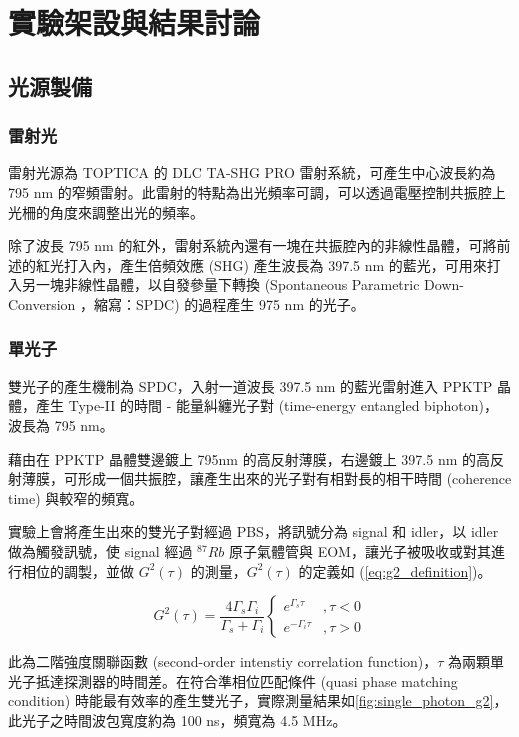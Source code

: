 \documentclass[class=NCU_thesis, crop=false]{standalone}
\begin{document}
\chapter{實驗架設與結果討論}

\section{光源製備}

\subsection{雷射光}
雷射光源為 TOPTICA 的 DLC TA-SHG PRO 雷射系統，可產生中心波長約為 795 nm 的窄頻雷射。此雷射的特點為出光頻率可調，可以透過電壓控制共振腔上光柵的角度來調整出光的頻率。

除了波長 795 nm 的紅外，雷射系統內還有一塊在共振腔內的非線性晶體，可將前述的紅光打入內，產生倍頻效應 (SHG) 產生波長為 397.5 nm 的藍光，可用來打入另一塊非線性晶體，以自發參量下轉換 (Spontaneous Parametric Down-Conversion ，縮寫：SPDC) 的過程產生 975 nm 的光子。


\subsection{單光子}
\label{subsection:single_photon}
雙光子的產生機制為 SPDC，入射一道波長 397.5 nm 的藍光雷射進入 PPKTP 晶體，產生 Type-II 的時間 - 能量糾纏光子對 (time-energy entangled biphoton)，波長為 795 nm。

藉由在 PPKTP 晶體雙邊鍍上 795nm 的高反射薄膜，右邊鍍上 397.5 nm 的高反射薄膜，可形成一個共振腔，讓產生出來的光子對有相對長的相干時間 (coherence time) 與較窄的頻寬。

實驗上會將產生出來的雙光子對經過 PBS，將訊號分為 signal 和 idler，以 idler 做為觸發訊號，使 signal 經過 $^{87}Rb$ 原子氣體管與 EOM，讓光子被吸收或對其進行相位的調製，並做 $G^{2}(\tau)$ 的測量，$G^{2}(\tau)$ 的定義如 (\ref{eq:g2_definition})。

\begin{equation}
    G^{2}(\tau)=\frac{4\Gamma_{s}\Gamma_{i}}{\Gamma_{s}+\Gamma_{i}}\left\{\begin{matrix}
        e^{\Gamma_{s}\tau} & ,\tau<0\\
        e^{-\Gamma_{i}\tau} & ,\tau>0
        \end{matrix}\right.
\label{eq:g2_definition}
\end{equation}

此為二階強度關聯函數 (second-order intenstiy correlation function)，$\tau$ 為兩顆單光子抵達探測器的時間差。在符合準相位匹配條件 (quasi phase matching condition) 時能最有效率的產生雙光子，實際測量結果如\cref{fig:single_photon_g2}，此光子之時間波包寬度約為 100 ns，頻寬為 4.5 MHz。
\end{document}
